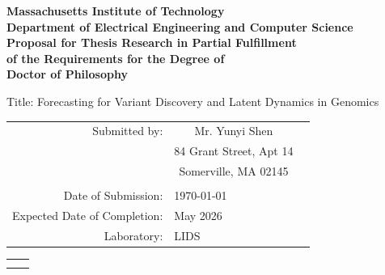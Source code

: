 \documentclass{article}
\begin{document}
\pagestyle{empty}

\def\abstract{
To propose a suit of methods prerforming various forecastings in genetics studies.
}


\begin{center}
{\Large \bf 
   Massachusetts Institute of Technology
\\ Department of Electrical Engineering and Computer Science \\}
\vspace{.25in}
{\Large \bf
   Proposal for Thesis Research in Partial Fulfillment
\\ of the Requirements for the Degree of
\\ Doctor of Philosophy \\}
\end{center}

\vspace{.5in}

\def\sig{{\small \sc (Signature of Author)}}


{\small\sc Title}: Forecasting for Variant Discovery and Latent Dynamics in Genomics



\begin{tabular}{rcl}
\\ {\small \sc Submitted by:}
                            & Mr. Yunyi Shen  & \\
                            & 84 Grant Street, Apt 14 & \\
                            & Somerville, MA 02145 & \\ 
\\ {\small \sc Date of Submission:}          & \multicolumn{2}{l}{\today}
\\ {\small \sc Expected Date of Completion:} & \multicolumn{2}{l}{May 2026}
\\ {\small \sc Laboratory:}                  & \multicolumn{2}{l}{LIDS}
\end{tabular}

\vspace{0.4cm}


  \begin{tabular}{@{}p{.5in}p{4in}@{}}
 & \hrulefill \\
& \quad\quad\quad\quad\quad\quad\quad\quad\quad\quad\quad\quad\quad\quad\quad\quad\quad\quad \sig
  \end{tabular}
\end{document}
